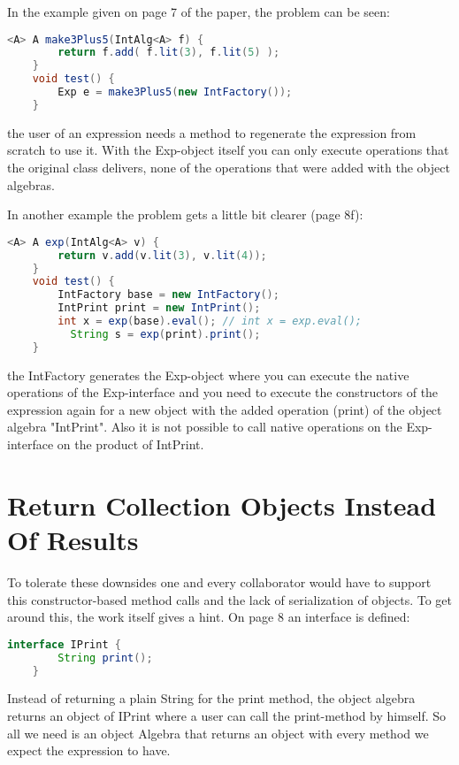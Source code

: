 \documentclass{report}
\begin{document}
In the example given on page 7 of the paper, the problem can be seen:

\begin{lstlisting}[language=java]
    <A> A make3Plus5(IntAlg<A> f) {
        return f.add( f.lit(3), f.lit(5) );
    }
    void test() {
        Exp e = make3Plus5(new IntFactory());
    }
\end{lstlisting}

the user of an expression needs a method to regenerate the expression from scratch to use it. With the Exp-object itself you can only execute operations that the original class delivers, none of the operations that were added with the object algebras. 

In another example the problem gets a little bit clearer (page 8f):

\begin{lstlisting}[language=java]
    <A> A exp(IntAlg<A> v) {
        return v.add(v.lit(3), v.lit(4));
    }
    void test() {
        IntFactory base = new IntFactory();
        IntPrint print = new IntPrint();
        int x = exp(base).eval(); // int x = exp.eval();
￼￼        String s = exp(print).print();
    }
\end{lstlisting}

the IntFactory generates the Exp-object where you can execute the native operations of the Exp-interface and you need to execute the constructors of the expression again for a new object with the added operation (print) of the object algebra "IntPrint". Also it is not possible to call native operations on the Exp-interface on the product of IntPrint.

\section{Return Collection Objects Instead Of Results}

To tolerate these downsides one and every collaborator would have to support this constructor-based method calls and the lack of serialization of objects. To get around this, the work itself gives a hint. On page 8 an interface is defined:

\begin{lstlisting}[language=java]
    interface IPrint {
        String print();
    }
\end{lstlisting}

Instead of returning a plain String for the print method, the object algebra returns an object of IPrint where a user can call the print-method by himself. So all we need is an object Algebra that returns an object with every method we expect the expression to have.
\end{document}
